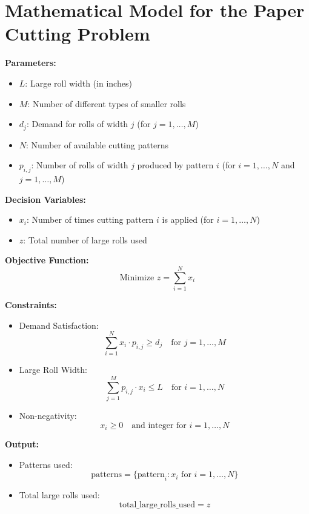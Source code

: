 \documentclass{article}
\begin{document}
\section*{Mathematical Model for the Paper Cutting Problem}

\textbf{Parameters:}
\begin{itemize}
    \item $L$: Large roll width (in inches)
    \item $M$: Number of different types of smaller rolls
    \item $d_j$: Demand for rolls of width $j$ (for $j = 1, \ldots, M$)
    \item $N$: Number of available cutting patterns
    \item $p_{i,j}$: Number of rolls of width $j$ produced by pattern $i$ (for $i = 1, \ldots, N$ and $j = 1, \ldots, M$)
\end{itemize}

\textbf{Decision Variables:}
\begin{itemize}
    \item $x_i$: Number of times cutting pattern $i$ is applied (for $i = 1, \ldots, N$)
    \item $z$: Total number of large rolls used
\end{itemize}

\textbf{Objective Function:}
\[
\text{Minimize } z = \sum_{i=1}^{N} x_i
\]

\textbf{Constraints:}
\begin{itemize}
    \item Demand Satisfaction:
    \[
    \sum_{i=1}^{N} x_i \cdot p_{i,j} \geq d_j \quad \text{for } j = 1, \ldots, M
    \]
    \item Large Roll Width:
    \[
    \sum_{j=1}^{M} p_{i,j} \cdot x_i \leq L \quad \text{for } i = 1, \ldots, N
    \]
    \item Non-negativity:
    \[
    x_i \geq 0 \quad \text{and integer for } i = 1, \ldots, N
    \]
\end{itemize}

\textbf{Output:}
\begin{itemize}
    \item Patterns used:
    \[
    \text{patterns} = \{ \text{pattern}_i: x_i \text{ for } i = 1, \ldots, N \}
    \]
    \item Total large rolls used:
    \[
    \text{total\_large\_rolls\_used} = z
    \]
\end{itemize}
\end{document}
